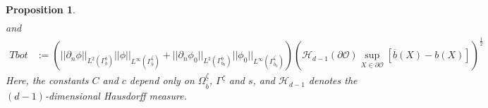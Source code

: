 \documentclass[11pt]{article}
\newtheorem{proposition}[theorem]{Proposition}
\begin{document}
\begin{proposition}
\begin{equation}
\begin{split}
		\end{split}
	\end{equation}
	and
    \begin{equation}\label{bottem}
		\begin{split}
			Tbot&:=\left(||\partial_n \phi||_{L^2(\Gamma_{b}^{\overline{b}})} ||\phi||_{L^{\infty}(\Gamma_{b}^{\underline{\zeta}})}+||\partial_n \phi_0||_{L^2(\Gamma_{b_0}^{\overline{b}})} ||\phi_0||_{L^{\infty}(\Gamma_{b_0}^{\underline{\zeta}})}\right)\left( \mathcal{H}_{d-1}(\partial \mathcal O)  \sup_{X\in \partial \mathcal O} [\overline{b}(X)-b(X)]\right)^{\frac{1}{2}} 
		\end{split}
	\end{equation}
	Here, the constants  $C$ and $c$ depend only on $\Omega_{\overline{b}}^{\underline{\zeta}}$, $\Gamma^{\underline{\zeta}}$ and $s$, and $\mathcal{H}_{d-1}$ denotes the $(d-1)$\nobreakdash-dimensional Hausdorff measure.
\end{proposition}
\end{document}
